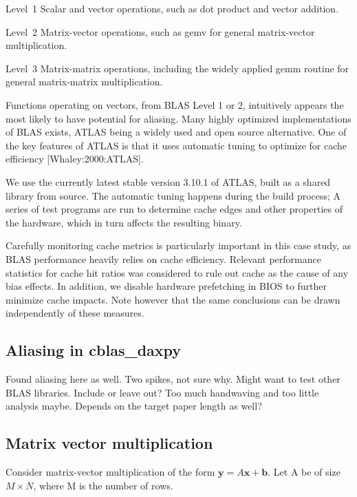 \documentclass[a4paper,10pt,twocolumn,twoside]{article}
\begin{document}
{\begin{description}
  \item{Level~1} Scalar and vector operations, such as dot product and vector addition.
  \item{Level~2} Matrix-vector operations, such as gemv for general matrix-vector multiplication.
  \item{Level~3} Matrix-matrix operations, including the widely applied gemm routine for general matrix-matrix multiplication. 
\end{description}

Functions operating on vectors, from BLAS Level 1 or 2, intuitively appears the most likely to have potential for aliasing.
Many highly optimized implementations of BLAS exists, ATLAS being a widely used and open source alternative. One of the key features of ATLAS is that it uses automatic tuning to optimize for cache efficiency [Whaley:2000:ATLAS]. 

We use the currently latest stable version 3.10.1 of ATLAS, built as a shared library from source.
The automatic tuning happens during the build process; A series of test programs are run to determine cache edges and other properties of the hardware, which in turn affects the resulting binary. 

Carefully monitoring cache metrics is particularly important in this case study, as BLAS performance heavily relies on cache efficiency.
Relevant performance statistics for cache hit ratios was considered to rule out cache as the cause of any bias effects.
In addition, we disable hardware prefetching in BIOS to further minimize cache impacts. 
Note however that the same conclusions can be drawn independently of these measures.

\subsection{Aliasing in cblas\_daxpy}
Found aliasing here as well. Two spikes, not sure why. Might want to test other BLAS libraries. Include or leave out? Too much handwaving and too little analysis maybe. Depends on the target paper length as well?



\subsection{Matrix vector multiplication}

Consider matrix-vector multiplication of the form $\boldsymbol{y} = A\boldsymbol{x} + \boldsymbol{b}$.
Let A be of size $M \times N$, where M is the number of rows. 

}
\end{document}
